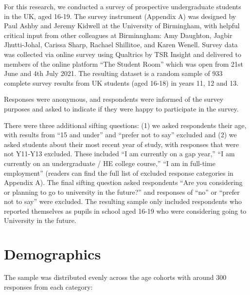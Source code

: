 \documentclass[
  letterpaper,
  DIV=11,
  numbers=noendperiod]{scrartcl}
\begin{document}
For this research, we conducted a survey of prospective undergraduate
students in the UK, aged 16-19. The survey instrument (Appendix A) was
designed by Paul Ashby and Jeremy Kidwell at the University of
Birmingham, with helpful critical input from other colleagues at
Birminngham: Amy Daughton, Jagbir Jhutti-Johal, Carissa Sharp, Rachael
Shillitoe, and Karen Wenell. Survey data was collected via online survey
using Qualtrics by TSR Insight and delivered to members of the online
platform ``The Student Room'' which was open from 21st June and 4th July
2021. The resulting dataset is a random sample of 933 complete survey
results from UK students (aged 16-18) in years 11, 12 and 13.

Responses were anonymous, and respondents were informed of the survey
purposes and asked to indicate if they were happy to participate in the
survey.

There were three additional sifting questions: (1) we asked respondents
their age, with results from ``15 and under'' and ``prefer not to say''
excluded and (2) we asked students about their most recent year of
study, with responses that were not Y11-Y13 excluded. These included ``I
am currently on a gap year,'' ``I am currently on an undergraduate / HE
college course,'' ``I am in full-time employment'' (readers can find the
full list of excluded response categories in Appendix A). The final
sifting question asked respondents ``Are you considering or planning to
go to university in the future?'' and responses of ``no'' or ``prefer
not to say'' were excluded. The resulting sample only included
respondents who reported themselves as pupils in school aged 16-19 who
were considering going to University in the future.

\hypertarget{demographics}{%
\section{Demographics}\label{demographics}}

The sample was distributed evenly across the age cohorts with around 300
responses from each category:
\end{document}
